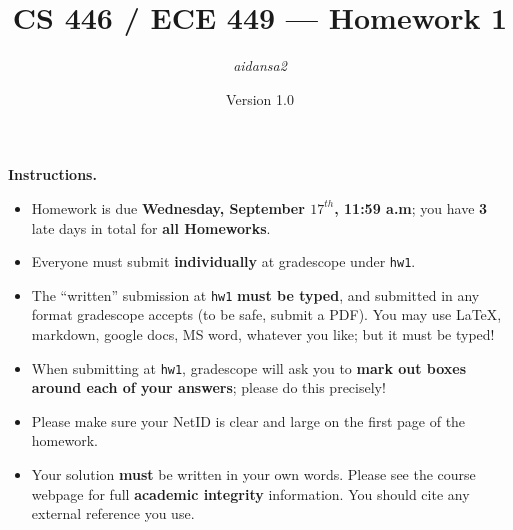 \documentclass{article}
\title{CS 446 / ECE 449 --- Homework 1}
\author{\emph{aidansa2}}
\date{Version 1.0}
\theoremstyle{definition}
\theoremstyle{remark}
\begin{document}
        \maketitle

        \noindent\textbf{Instructions.}
        \begin{itemize}
          \item
            Homework is due \textbf{Wednesday, September $17^{th}$, 11:59 a.m}; you have \textbf{3} late days in total for \textbf{all Homeworks}.
        
          \item
            Everyone must submit \textbf{individually} at gradescope under \texttt{hw1}. 

        
          \item
            The ``written'' submission at \texttt{hw1} \textbf{must be typed}, and submitted in
            any format gradescope accepts (to be safe, submit a PDF).  You may use \LaTeX, markdown,
            google docs, MS word, whatever you like; but it must be typed!
        
          \item
            When submitting at \texttt{hw1}, gradescope will ask you to \textbf{mark out boxes
            around each of your answers}; please do this precisely!
        
          \item
            Please make sure your NetID is clear and large on the first page of the homework.
        
          \item
            Your solution \textbf{must} be written in your own words.
            Please see the course webpage for full \textbf{academic integrity} information.
            You should cite any external reference you use.
        

           
        \end{itemize}
\end{document}
